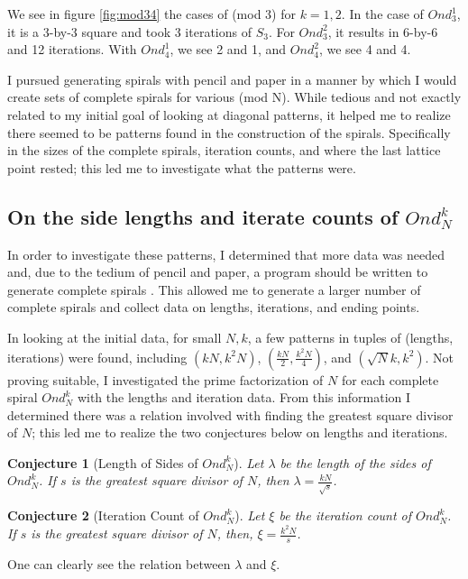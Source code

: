 \documentclass[11pt]{amsart}
\theoremstyle{mydef}
\newtheorem{conj}{Conjecture}[section]
\begin{document}
We see in figure \ref{fig:mod34} the cases of (mod 3) for $k=1,2$.  In the case of $Ond^1_3$, it is a 3-by-3 square and took 3 iterations of $S_3$. For $Ond^2_3$, it results in 6-by-6 and 12 iterations. With $Ond^1_4$, we see 2 and 1, and $Ond^2_4$, we see 4 and 4.

I pursued generating spirals with pencil and paper in a manner by which I would create sets of complete spirals for various (mod N). While tedious and not exactly related to my initial goal of looking at diagonal patterns, it helped me to realize there seemed to be patterns found in the construction of the spirals. Specifically in the sizes of the complete spirals, iteration counts, and where the last lattice point rested; this led me to investigate what the patterns were.

\subsection{On the side lengths and iterate counts of $Ond^k_N$}
In order to investigate these patterns, I determined that more data was needed and, due to the tedium of pencil and paper, a program should be written to generate complete spirals \cite{PySquare}. This allowed me to generate a larger number of complete spirals and collect data on lengths, iterations, and ending points. 

In looking at the initial data, for small $N, k$, a few patterns in tuples of (lengths, iterations) were found, including $(kN, k^2N)$, $(\frac{kN}{2}, \frac{k^2N}{4})$, and $(\sqrt{N}k, k^2)$. Not proving suitable, I investigated the prime factorization of $N$ for each complete spiral $Ond^k_N$ with the lengths and iteration data. From this information I determined there was a relation involved with finding the greatest square divisor of $N$; this led me to realize the two conjectures below on lengths and iterations. 

\begin{conj}[Length of Sides of $Ond^k_N$]
Let $\lambda$ be the length of the sides of $Ond^k_N$. If $s$ is the greatest square divisor of $N$, then $\lambda = \frac{kN}{\sqrt{s}}$.
\end{conj}

\begin{conj}[Iteration Count of $Ond^k_N$]
Let $\xi$ be the iteration count  of $Ond^k_N$. If $s$ is the greatest square divisor of $N$,  then, $\xi = \frac{k^2N}{s}$.
\end{conj}

One can clearly see the relation between $\lambda$ and $\xi$. 
\end{document}
